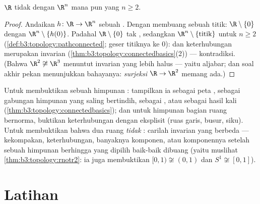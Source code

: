 \begin{theorem}\label{thm:b3:topology:rnotr2}
$\R$ tidak  dengan $\R^n$ mana pun yang $n \geq 2$.
\end{theorem}

\begin{proof}
Andaikan $h \colon \R \to \R^n$ sebuah . Dengan membuang sebuah
titik: $\R \setminus \{0\}$  dengan $\R^n \setminus
\{h(0)\}$. Padahal $\R\setminus\{0\}$ tak , sedangkan
$\R^n\setminus\{\text{titik}\}$  untuk $n \geq
2$ (\cref{def:b3:topology:pathconnected}; geser titiknya ke
$0$): dan keterhubungan merupakan invarian 
(\cref{thm:b3:topology:connectedbasics}(2)) --- kontradiksi.
(Bahwa $\R^2 \not\cong \R^3$ menuntut invarian yang lebih halus ---
yaitu  aljabar; dan soal akhir pekan menunjukkan bahayanya:
\emph{surjeksi } $\R \to \R^2$ memang ada.)
\end{proof}

\begin{method}\label{met:b3:topology:connectargument}
Untuk membuktikan sebuah himpunan : tampilkan ia sebagai peta ,
sebagai gabungan himpunan  yang saling bertindih, sebagai , atau sebagai hasil kali
(\cref{thm:b3:topology:connectedbasics}); dan untuk himpunan bagian ruang
bernorma, buktikan keterhubungan  dengan  eksplisit (ruas garis,
busur, siku). Untuk membuktikan bahwa dua ruang \emph{tidak} :
carilah invarian  yang berbeda --- kekompakan,
keterhubungan, banyaknya komponen, atau komponennya setelah
sebuah himpunan berhingga yang dipilih baik-baik dibuang (yaitu muslihat
\cref{thm:b3:topology:rnotr2}: ia juga membuktikan $[0,1) \not\cong
(0,1)$ dan $S^1 \not\cong [0,1]$).
\end{method}

\section{Latihan}

